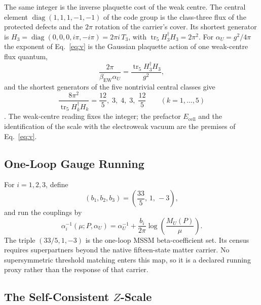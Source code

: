\documentclass[11pt]{article}
\theoremstyle{remark}
\begin{document}
The same integer is the inverse plaquette cost of the weak centre. The central
element \(\operatorname{diag}(1,1,1,-1,-1)\) of the code group is the class-three
flux of the protected defects and the \(2\pi\) rotation of the carrier's cover.
Its shortest generator is \(H_3=\operatorname{diag}(0,0,0,i\pi,-i\pi)=2\pi i\,T_3\),
with \(\operatorname{tr}_5H_3^\dagger H_3=2\pi^2\). For \(\alpha_U=g^2/4\pi\) the
exponent of Eq.~\eqref{eq:v} is the Gaussian plaquette action of one weak-centre
flux quantum,
\begin{equation}
\frac{2\pi}{\beta_{\mathrm{EW}}\alpha_U}
=\frac{\operatorname{tr}_5H_3^\dagger H_3}{g^2},
\end{equation}
and the shortest generators of the five nontrivial central classes give
\begin{equation}
\frac{8\pi^2}{\operatorname{tr}_5H_k^\dagger H_k}
=\frac{12}{5},\;3,\;4,\;3,\;\frac{12}{5}\qquad(k=1,\dots,5)
\end{equation}
\cite{oph-smgr,oph-particle}. The weak-centre reading fixes the integer; the
prefactor \(E_{\mathrm{cell}}\) and the identification of the scale with the
electroweak vacuum are the premises of Eq.~\eqref{eq:v}.


\subsection{One-Loop Gauge Running}
\label{sec:alpha-step-9}

For \(i=1,2,3\), define
\begin{equation}
(b_1,b_2,b_3)=\left(\frac{33}{5},\,1,\,-3\right),
\label{eq:b}
\end{equation}
and run the couplings by
\begin{equation}
\alpha_i^{-1}(\mu;P,\alpha_U)
=
\alpha_U^{-1}
+
\frac{b_i}{2\pi}\log\!\left(\frac{M_U(P)}{\mu}\right).
\label{eq:running}
\end{equation}
The triple \((33/5,1,-3)\) is the one-loop MSSM beta-coefficient set. Its
census requires superpartners beyond the native fifteen-state matter
carrier. No supersymmetric threshold matching enters this map, so it is a
declared running proxy rather than the response of that carrier.



\subsection{The Self-Consistent \(Z\)-Scale}
\label{sec:alpha-step-10}
\end{document}
